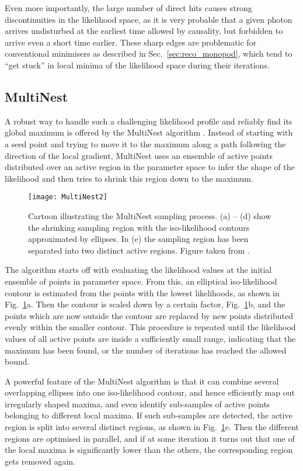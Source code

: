Even more importantly, the large number of direct hits causes strong
discontinuities in the likelihood space, as it is very probable that a given
photon arrives undisturbed at the earliest time allowed by causality, but
forbidden to arrive even a short time earlier. These sharp edges are
problematic for conventional minimisers as described in
Sec.~\ref{sec:reco_monopod}, which tend to ``get stuck'' in local minima of the
likelihood space during their iterations.

\subsection{MultiNest}

A robust way to handle such a challenging likelihood profile and reliably find
its global maximum is offered by the MultiNest algorithm \cite{MultiNest1,
MultiNest2}. Instead of starting with a seed point and trying to move it to
the maximum along a path following the direction of the local gradient,
MultiNest uses an ensemble of active points distributed over an active region
in the parameter space to infer the shape of the likelihood and then tries to
shrink this region down to the maximum.

\begin{figure}[ht]
 \centering
 \texttt{[image: MultiNest2]}
\caption{Cartoon illustrating the MultiNest sampling process. (a) -- (d) show
  the shrinking sampling region with the iso-likelihood contours approximated
  by ellipses. In (e) the sampling region has been separated into two  distinct
  active regions. Figure taken from \cite{MultiNest1}.}
\label{fig:MultiNest_process}
\end{figure} 

The algorithm starts off with evaluating the likelihood values at the initial
ensemble of points in parameter space. From this, an elliptical iso-likelihood
contour is estimated from the points with the lowest likelihoods, as shown in
Fig.~\ref{fig:MultiNest_process}a. Then the contour is scaled down by a certain
factor, Fig.~\ref{fig:MultiNest_process}b, and the points which are now outside
the contour are replaced by new points distributed evenly within the smaller
contour. This procedure is repeated until the likelihood values of all active
points are inside a sufficiently small range, indicating that the maximum has
been found, or the number of iterations has reached the allowed bound.

A powerful feature of the MultiNest algorithm is that it can combine several
overlapping ellipses into one iso-likelihood contour, and hence efficiently map
out irregularly shaped maxima, and even identify sub-samples of active points
belonging to different local maxima. If such sub-samples are detected, the
active region is split into several distinct regions, as shown in
Fig.~\ref{fig:MultiNest_process}e. Then the different regions are optimised in
parallel, and if at some iteration it turns out that one of the local maxima is
significantly lower than the others, the corresponding region gets removed
again.

